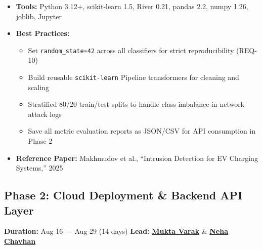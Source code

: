 \documentclass[11pt, a4paper]{article}
\newcommand{\goref}[2]{\hyperref[#1]{\textcolor{primary}{\textbf{#2}}}}
\begin{document}
\begin{toolbox}
\small
\begin{itemize}[nosep]
    \item \textbf{Tools:} Python 3.12+, scikit-learn 1.5, River 0.21, pandas 2.2, numpy 1.26, joblib, Jupyter
    \item \textbf{Best Practices:}
    \begin{itemize}[nosep]
        \item Set \texttt{random\_state=42} across all classifiers for strict reproducibility (REQ-10)
        \item Build reusable \texttt{scikit-learn} Pipeline transformers for cleaning and scaling
        \item Stratified 80/20 train/test splits to handle class imbalance in network attack logs
        \item Save all metric evaluation reports as JSON/CSV for API consumption in Phase 2
    \end{itemize}
    \item \textbf{Reference Paper:} Makhmudov et al., ``Intrusion Detection for EV Charging Systems,'' 2025
\end{itemize}
\end{toolbox}

\subsection{Phase 2: Cloud Deployment \& Backend API Layer}
\label{sec:phase2}
\textbf{Duration:} Aug 16 — Aug 29 (14 days) \hfill \textbf{Lead:} \goref{sec:team}{Mukta Varak} \& \goref{sec:team}{Neha Chavhan}
\end{document}
